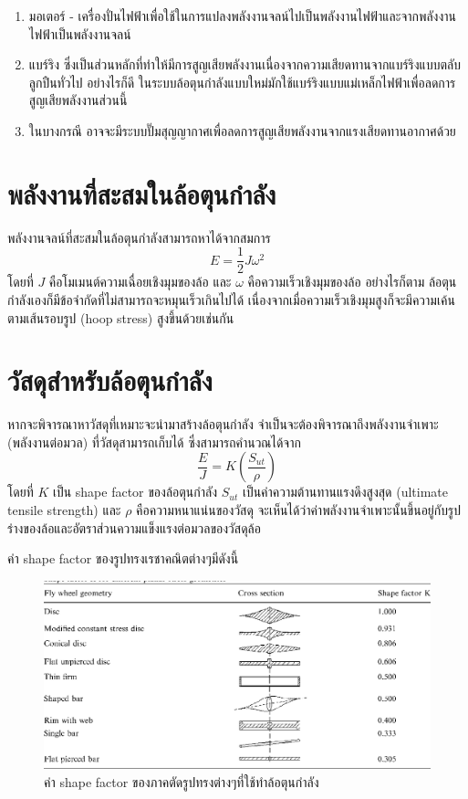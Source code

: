 \documentclass[a4paper,nobib,openany,10pt]{tufte-book}
\begin{document}
\begin{enumerate}
\item มอเตอร์ -
เครื่องปั่นไฟฟ้าเพื่อใช้ในการแปลงพลังงานจลน์ไปเป็นพลังงานไฟฟ้าและจากพลังงานไฟฟ้าเป็นพลังงานจลน์

\item แบร์ริง
ซึ่งเป็นส่วนหลักที่ทำให้มีการสูญเสียพลังงานเนื่องจากความเสียดทานจากแบร์ริงแบบตลับลูกปืนทั่วไป
อย่างไรก็ดี
ในระบบล้อตุนกำลังแบบใหม่มักใช้แบร์ริงแบบแม่เหล็กไฟฟ้าเพื่อลดการสูญเสียพลังงานส่วนนี้

\item ในบางกรณี
อาจจะมีระบบปั๊มสุญญากาศเพื่อลดการสูญเสียพลังงานจากแรงเสียดทานอากาศด้วย
\end{enumerate}

\section{พลังงานที่สะสมในล้อตุนกำลัง}
\label{sec:orgd696fae}
พลังงานจลน์ที่สะสมในล้อตุนกำลังสามารถหาได้จากสมการ
\[E = \frac{1}{2}J \omega^2\] โดยที่ \(J\)
คือโมเมนต์ความเฉื่อยเชิงมุมของล้อ และ \(\omega\)
คือความเร็วเชิงมุมของล้อ อย่างไรก็ตาม
ล้อตุนกำลังเองก็มีข้อจำกัดที่ไม่สามารถจะหมุนเร็วเกินไปได้
เนื่องจากเมื่อความเร็วเชิงมุมสูงก็จะมีความเค้นตามเส้นรอบรูป (hoop
stress) สูงขึ้นด้วยเช่นกัน

\section{วัสดุสำหรับล้อตุนกำลัง}
\label{sec:org61688e7}
หากจะพิจารณาหาวัสดุที่เหมาะจะนำมาสร้างล้อตุนกำลัง
จำเป็นจะต้องพิจารณาถึงพลังงานจำเพาะ (พลังงานต่อมวล)
ที่วัสดุสามารถเก็บได้ ซึ่งสามารถคำนวณได้จาก
\[\frac{E}{J} = K \left( \frac{S_{ut}}{\rho} \right)\] โดยที่ \(K\) เป็น
shape factor ของล้อตุนกำลัง \(S_{ut}\) เป็นค่าความต้านทานแรงดึงสูงสุด
(ultimate tensile strength) และ \(\rho\) คือความหนาแน่นของวัสดุ
จะเห็นได้ว่าค่าพลังงานจำเพาะนั้นขึ้นอยู่กับรูปร่างของล้อและอัตราส่วนความแข็งแรงต่อมวลของวัสดุล้อ

ค่า shape factor ของรูปทรงเรชาคณิตต่างๆมีดังนี้

\begin{figure}[htbp]
\centering
\includegraphics[width=.9\linewidth]{./pictures/flywheel-shape-factor.png}
\caption{ค่า shape factor ของภาคตัดรูปทรงต่างๆที่ใช้ทำล้อตุนกำลัง}
\end{figure}
\end{document}
